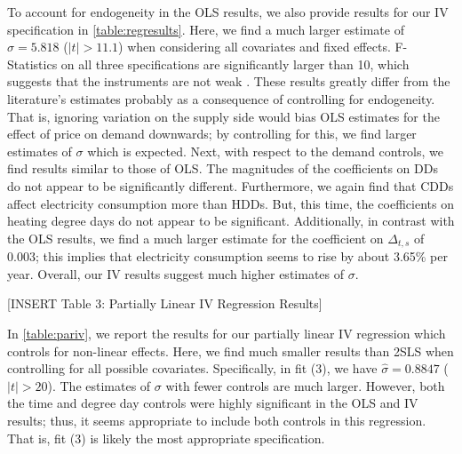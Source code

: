 \documentclass[11pt,a4paper,leqno]{extarticle}
\begin{document}
	
	To account for endogeneity in the OLS results, we also provide results for our IV specification in \autoref{table:regresults}. Here, we find a much larger estimate of $\hat{\sigma}  = 5.818$ ($|t| > 11.1$) when considering all covariates and fixed effects. F-Statistics on all three specifications are significantly larger than 10, which suggests that the instruments are not weak \citep{SS1997}. These results greatly differ from the literature's estimates probably as a consequence of controlling for endogeneity. That is, ignoring variation on the supply side would bias OLS estimates for the effect of price on demand downwards; by controlling for this, we find larger estimates of $\sigma$ which is expected. Next, with respect to the demand controls, we find results similar to those of OLS. The magnitudes of the coefficients on DDs do not appear to be significantly different. Furthermore, we again find that CDDs affect electricity consumption more than HDDs. But, this time, the coefficients on heating degree days do not appear to be significant. Additionally, in contrast with the OLS results, we find a much larger estimate for the coefficient on $\Delta_{t,s}$ of $0.003$; this implies that electricity consumption seems to rise by about 3.65\% per year. Overall, our IV results suggest much higher estimates of $\sigma$. 
	
	\vspace{0.15in}
	\begin{center}
		[INSERT Table 3: Partially Linear IV Regression Results]
	\end{center}
	\vspace{0.15in}
	
	
	
	In \autoref{table:pariv}, we report the results for our partially linear IV regression  which controls for non-linear effects.   Here, we find much smaller results than 2SLS when controlling for all possible covariates. Specifically, in fit (3), we have $\hat{\sigma} = 0.8847$ ($|t| > 20$). The estimates of $\sigma$ with fewer controls are much larger. However, both the time and degree day controls were highly significant in the OLS and IV results; thus, it seems appropriate to include both controls in this regression. That is, fit (3) is likely the most appropriate specification. 
	
\end{document}
